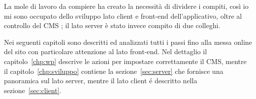 La mole di lavoro da compiere ha creato la necessità di dividere i compiti, così io mi sono occupato dello sviluppo lato client e front-end dell'applicativo, oltre al controllo del CMS {\wp}; il lato server è stato invece compito di due colleghi.

Nei seguenti capitoli sono descritti ed analizzati tutti i passi fino alla messa online del sito con particolare attenzione al lato front-end. Nel dettaglio il capitolo~\ref{chp:wp} descrive le azioni per impostare correttamente il CMS, mentre il capitolo~\ref{chp:sviluppo} contiene la sezione~\ref{sec:server} che fornisce una panoramica sul lato server, mentre il lato client é descritto nella sezione~\ref{sec:client}.
